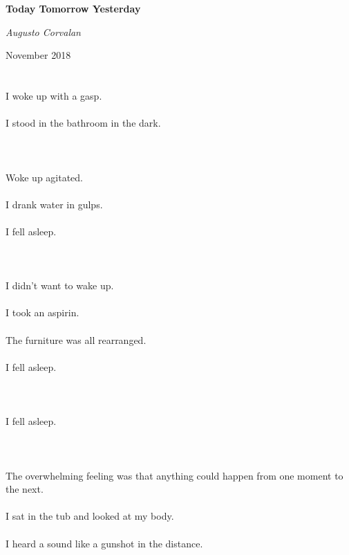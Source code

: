 \documentclass{article}
\begin{document}
    \begin{titlepage}
    \centering
    \vspace{5cm}
    {\huge\bfseries Today Tomorrow Yesterday \par}
    \vspace{2cm}
    {\Large\itshape Augusto Corvalan\par}
    \vfill
    {\large November 2018\par}
    \end{titlepage}

    
    \section{}
    I woke up with a gasp.\\\\I stood in the bathroom in the dark.\\\\ 
    \newpage
    
    \section{}
    Woke up agitated.\\\\I drank water in gulps.\\\\I fell asleep.\\\\ 
    \newpage
    
    \section{}
    I didn't want to wake up.\\\\I took an aspirin.\\\\The furniture was all rearranged.\\\\I fell asleep.\\\\ 
    \newpage
    
    \section{}
    I fell asleep.\\\\ 
    \newpage
    
    \section{}
    The overwhelming feeling was that anything could happen from one moment to the next.\\\\I sat in the tub and looked at my body.\\\\I heard a sound like a gunshot in the distance.\\\\ 
    \newpage
    
\end{document}

